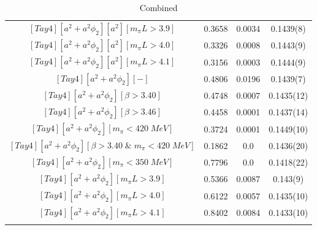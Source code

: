 \begin{longtable}{ c | c | c | c }
$[Tay4][a^2+a^2\phi_2][a^2][m_{\pi}L>3.9]$ & 0.3658 & 0.0034 & 0.1439(8) \\
$[Tay4][a^2+a^2\phi_2][a^2][m_{\pi}L>4.0]$ & 0.3326 & 0.0008 & 0.1443(9) \\
$[Tay4][a^2+a^2\phi_2][a^2][m_{\pi}L>4.1]$ & 0.3156 & 0.0003 & 0.1444(9) \\
$[Tay4][a^2+a^2\phi_2][-]$ & 0.4806 & 0.0196 & 0.1439(7) \\
$[Tay4][a^2+a^2\phi_2][\beta>3.40]$ & 0.4748 & 0.0007 & 0.1435(12) \\
$[Tay4][a^2+a^2\phi_2][\beta>3.46]$ & 0.4458 & 0.0001 & 0.1437(14) \\
$[Tay4][a^2+a^2\phi_2][m_{\pi}<420\;MeV]$ & 0.3724 & 0.0001 & 0.1449(10) \\
$[Tay4][a^2+a^2\phi_2][\beta>3.40\;\&\;m_{\pi}<420\;MeV]$ & 0.1862 & 0.0 & 0.1436(20) \\
$[Tay4][a^2+a^2\phi_2][m_{\pi}<350\;MeV]$ & 0.7796 & 0.0 & 0.1418(22) \\
$[Tay4][a^2+a^2\phi_2][m_{\pi}L>3.9]$ & 0.5366 & 0.0087 & 0.143(9) \\
$[Tay4][a^2+a^2\phi_2][m_{\pi}L>4.0]$ & 0.6122 & 0.0057 & 0.1435(10) \\
$[Tay4][a^2+a^2\phi_2][m_{\pi}L>4.1]$ & 0.8402 & 0.0084 & 0.1433(10) \\
\bottomrule
\caption{Combined}
\end{longtable}

